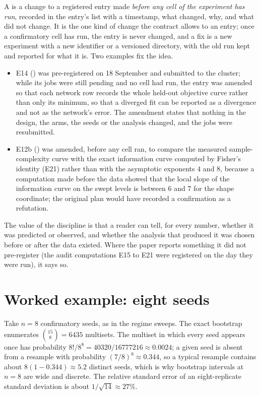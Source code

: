 A  is a change to a registered entry made \emph{before any
cell of the experiment has run}, recorded in the entry's  list with a
timestamp, what changed, why, and what did not change. It is the one kind of change
the contract allows to an entry; once a confirmatory cell has run, the entry is never
changed, and a fix is a new experiment with a new identifier or a versioned directory,
with the old run kept and reported for what it is. Two examples fix the idea.
\begin{itemize}
\item E14 () was pre-registered on 18 September
  and submitted to the cluster; while its jobs were still pending and no cell had run,
  the entry was amended so that each network row records the whole held-out objective
  curve rather than only its minimum, so that a diverged fit can be reported as a
  divergence and not as the network's error. The amendment states that nothing in the
  design, the arms, the seeds or the analysis changed, and the jobs were resubmitted.
\item E12b () was amended, before any cell ran,
  to compare the measured sample-complexity curve with the exact information curve
  computed by Fisher's identity (E21) rather than with the asymptotic exponents $4$
  and $8$, because a computation made before the data showed that the local slope of
  the information curve on the swept levels is between $6$ and $7$ for the shape
  coordinate; the original plan would have recorded a confirmation as a refutation.
\end{itemize}
The value of the discipline is that a reader can tell, for every number, whether it
was predicted or observed, and whether the analysis that produced it was chosen before
or after the data existed. Where the paper reports something it did not pre-register
(the audit computations E15 to E21 were registered on the day they were run), it says so.

\section{Worked example: eight seeds}

Take $n=8$ confirmatory seeds, as in the regime sweeps. The exact bootstrap
enumerates $\binom{15}{8}=6435$ multisets. The multiset in which every seed appears
once has probability $8!/8^8=40320/16777216\approx0.0024$; a given seed is absent from
a resample with probability $(7/8)^8\approx0.344$, so a typical resample contains
about $8(1-0.344)\approx5.2$ distinct seeds, which is why bootstrap intervals at $n=8$
are wide and discrete. The relative standard error of an eight-replicate standard
deviation is about $1/\sqrt{14}\approx27\%$.

